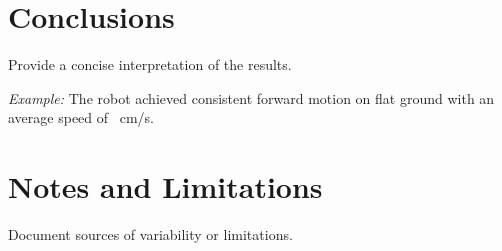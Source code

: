 \documentclass[11pt]{article}
\begin{document}
\section*{Conclusions}
Provide a concise interpretation of the results.

\textit{Example:} The robot achieved consistent forward motion on flat ground with an average speed of \underline{\hspace{1 cm}}~cm/s. 

\section*{Notes and Limitations}
Document sources of variability or limitations.
\end{document}
